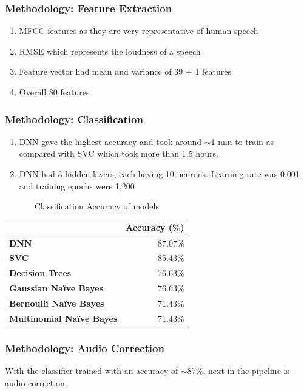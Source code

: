 \documentclass{beamer}
\begin{document}
\begin{frame}
\frametitle{Methodology: Feature Extraction}
\begin{enumerate}
 \item MFCC features as they are very representative of human speech
 \item RMSE which represents the loudness of a speech
 \item Feature vector had mean and variance of 39 + 1 features
 \item Overall 80 features
\end{enumerate}
\end{frame}

\begin{frame}
\frametitle{Methodology: Classification}
\begin{enumerate}
 \item DNN gave the highest accuracy and took around $\sim$1 min to train as compared with SVC which took more than 1.5 hours.

 \item DNN had 3 hidden layers, each having 10 neurons. Learning rate was 0.001 and training epochs were 1,200
\end{enumerate}
\begin{table}[ht]
\centering
\caption{Classification Accuracy of models}
\label{table:classificationAccuracy}
\begin{tabular}{|l|r|}
\hline
                                   & \multicolumn{1}{l|}{\textbf{Accuracy (\%)}} \\ \hline
\textbf{DNN}                       & 87.07\%                                     \\ \hline
\textbf{SVC}                       & 85.43\%                                     \\ \hline
\textbf{Decision Trees}            & 76.63\%                                     \\ \hline
\textbf{Gaussian Na\"ive Bayes}    & 76.63\%                                     \\ \hline
\textbf{Bernoulli Na\"ive Bayes}   & 71.43\%                                     \\ \hline
\textbf{Multinomial Na\"ive Bayes} & 71.43\%                                     \\ \hline
\end{tabular}
\end{table}
\end{frame}

\begin{frame}
\frametitle{Methodology: Audio Correction}
With the classifier trained with an accuracy of $\sim$87\%, next in the pipeline is audio correction.
\end{frame}
\end{document}
